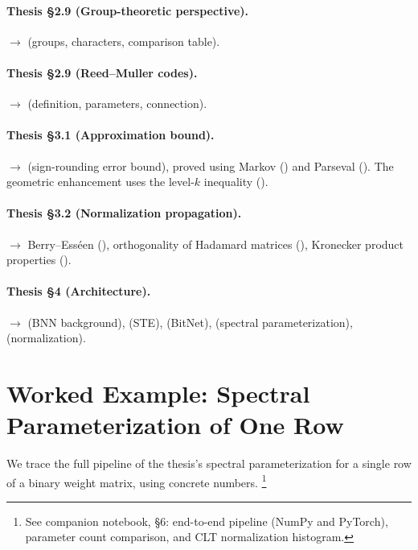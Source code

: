 \paragraph{Thesis \S2.9 (Group-theoretic perspective).}
$\to$  (groups, characters, comparison table).

\paragraph{Thesis \S2.9 (Reed--Muller codes).}
$\to$  (definition, parameters, connection).

\paragraph{Thesis \S3.1 (Approximation bound).}
$\to$  (sign-rounding error bound),
proved using Markov () and Parseval ().
The geometric enhancement uses the level-$k$ inequality ().

\paragraph{Thesis \S3.2 (Normalization propagation).}
$\to$ Berry--Ess\'een (),
orthogonality of Hadamard matrices (),
Kronecker product properties ().

\paragraph{Thesis \S4 (Architecture).}
$\to$  (BNN background),
 (STE),  (BitNet),
 (spectral parameterization),
 (normalization).


\section{Worked Example: Spectral Parameterization of One Row}\label{sec:worked-example}

We trace the full pipeline of the thesis's spectral parameterization for
a single row of a binary weight matrix, using concrete numbers.%
\footnote{See companion notebook, \S6: end-to-end pipeline
(NumPy and PyTorch), parameter count comparison, and CLT normalization
histogram.}

